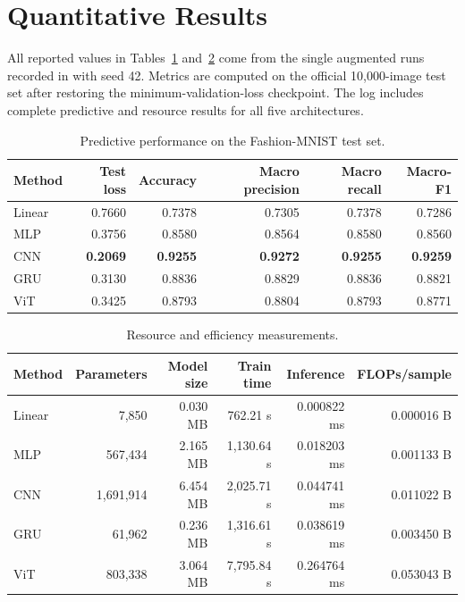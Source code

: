 \section{Quantitative Results}

All reported values in Tables~\ref{tab:predictive-results} and~\ref{tab:resource-results} come from the single augmented runs recorded in  with seed 42. Metrics are computed on the official 10,000-image test set after restoring the minimum-validation-loss checkpoint. The log includes complete predictive and resource results for all five architectures.

\begin{table}[H]
    \centering
    \caption{Predictive performance on the Fashion-MNIST test set.}
    \label{tab:predictive-results}
    \begin{tabular}{@{}lrrrrr@{}}
        \toprule
        Method & Test loss & Accuracy & Macro precision & Macro recall & Macro-F1 \\
        \midrule
        Linear & 0.7660 & 0.7378 & 0.7305 & 0.7378 & 0.7286 \\
        MLP & 0.3756 & 0.8580 & 0.8564 & 0.8580 & 0.8560 \\
        CNN & \textbf{0.2069} & \textbf{0.9255} & \textbf{0.9272} & \textbf{0.9255} & \textbf{0.9259} \\
        GRU & 0.3130 & 0.8836 & 0.8829 & 0.8836 & 0.8821 \\
        ViT & 0.3425 & 0.8793 & 0.8804 & 0.8793 & 0.8771 \\
        \bottomrule
    \end{tabular}
\end{table}

\begin{table}[H]
    \centering
    \caption{Resource and efficiency measurements.}
    \label{tab:resource-results}
    {
    \begin{tabular}{@{}lrrrrr@{}}
        \toprule
        Method & Parameters & Model size & Train time & Inference & FLOPs/sample \\
        \midrule
        Linear & 7,850 & 0.030 MB & 762.21 s & 0.000822 ms & 0.000016 B \\
        MLP & 567,434 & 2.165 MB & 1,130.64 s & 0.018203 ms & 0.001133 B \\
        CNN & 1,691,914 & 6.454 MB & 2,025.71 s & 0.044741 ms & 0.011022 B \\
        GRU & 61,962 & 0.236 MB & 1,316.61 s & 0.038619 ms & 0.003450 B \\
        ViT & 803,338 & 3.064 MB & 7,795.84 s & 0.264764 ms & 0.053043 B \\
        \bottomrule
    \end{tabular}}
\end{table}

